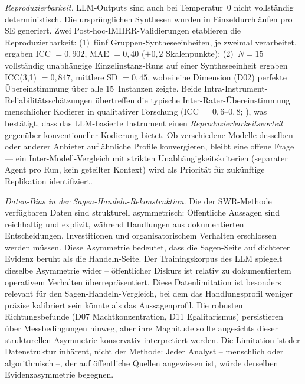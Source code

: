 \documentclass[12pt,a4paper]{article}
\begin{document}
\emph{Reproduzierbarkeit.} LLM-Outputs sind auch bei Temperatur~0 nicht vollst\"andig deterministisch. Die urspr\"unglichen Synthesen wurden in Einzeldurchl\"aufen pro SE generiert. Zwei Post-hoc-IMIIRR-Validierungen etablieren die Reproduzierbarkeit: (1)~f\"unf Gruppen-Syntheseeinheiten, je zweimal verarbeitet, ergaben ICC $= 0{,}902$, MAE $= 0{,}40$ ($\pm 0{,}2$ Skalenpunkte); (2)~$N = 15$ vollst\"andig unabh\"angige Einzelinstanz-Runs auf einer Syntheseeinheit ergaben ICC(3,1) $= 0{,}847$, mittlere SD $= 0{,}45$, wobei eine Dimension (D02) perfekte \"Ubereinstimmung \"uber alle 15~Instanzen zeigte. Beide Intra-Instrument-Reliabilit\"atssch\"atzungen \"ubertreffen die typische Inter-Rater-\"Ubereinstimmung menschlicher Kodierer in qualitativer Forschung (ICC $= 0{,}6$--$0{,}8$; \citealt{Hallgren2012}), was best\"atigt, dass das LLM-basierte Instrument einen \emph{Reproduzierbarkeits\-vorteil} gegen\"uber konventioneller Kodierung bietet. Ob verschiedene Modelle desselben oder anderer Anbieter auf \"ahnliche Profile konvergieren, bleibt eine offene Frage --- ein Inter-Modell-Vergleich mit strikten Unabh\"angigkeitskriterien (separater Agent pro Run, kein geteilter Kontext) wird als Priorit\"at f\"ur zuk\"unftige Replikation identifiziert.

\emph{Daten-Bias in der Sagen-Handeln-Rekonstruktion.} Die der SWR-Methode verf\"ugbaren Daten sind strukturell asymmetrisch: \"Offentliche Aussagen sind reichhaltig und explizit, w\"ahrend Handlungen aus dokumentierten Entscheidungen, Investitionen und organisatorischem Verhalten erschlossen werden m\"ussen. Diese Asymmetrie bedeutet, dass die \glqq Sagen\grqq-Seite auf dichterer Evidenz beruht als die \glqq Handeln\grqq-Seite. Der Trainingskorpus des LLM spiegelt dieselbe Asymmetrie wider -- \"offentlicher Diskurs ist relativ zu dokumentiertem operativem Verhalten \"uberrepr\"asentiert. Diese Datenlimitation ist besonders relevant f\"ur den Sagen-Handeln-Vergleich, bei dem das Handlungsprofil weniger pr\"azise kalibriert sein k\"onnte als das Aussagenprofil. Die robusten Richtungsbefunde (D07 Machtkonzentration, D11 Egalitarismus) persistieren \"uber Messbedingungen hinweg, aber ihre Magnitude sollte angesichts dieser strukturellen Asymmetrie konservativ interpretiert werden. Die Limitation ist der Datenstruktur inh\"arent, nicht der Methode: Jeder Analyst -- menschlich oder algorithmisch --, der auf \"offentliche Quellen angewiesen ist, w\"urde derselben Evidenzasymmetrie begegnen.
\end{document}
